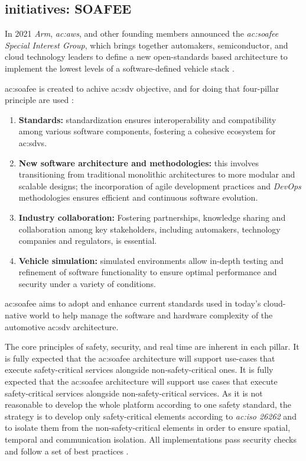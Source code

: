 \subsection{initiatives: SOAFEE}
In 2021 \textit{Arm}, \textit{\gls{ac:aws}}, and other founding members announced the \textit{\gls{ac:soafee} Special Interest Group}, which brings together automakers, semiconductor, and cloud technology leaders to define a new open-standards based architecture to implement the lowest levels of a software-defined vehicle stack \cite{DevelopersWorkflow}.

\gls{ac:soafee} is created to achive \gls{ac:sdv} objective, and for doing that four-pillar principle are used \cite{SoafeeProject}:
\begin{enumerate}
    \item \textbf{Standards:} standardization ensures interoperability and compatibility among various software components, fostering a cohesive ecosystem for \gls{ac:sdv}s.
    \item \textbf{New software architecture and methodologies:} this involves transitioning from traditional monolithic architectures to more modular and scalable designs; the incorporation of agile development practices and \textit{DevOps} methodologies ensures efficient and continuous software evolution.
    \item \textbf{Industry collaboration:} Fostering partnerships, knowledge sharing and collaboration among key stakeholders, including automakers, technology companies and regulators, is essential.
    \item \textbf{Vehicle simulation:} simulated environments allow in-depth testing and refinement of software functionality to ensure optimal performance and security under a variety of conditions.
\end{enumerate}
\gls{ac:soafee} aims to adopt and enhance current standards used in today's cloud-native world to help manage the software and hardware complexity of the automotive \gls{ac:sdv} architecture.

The core principles of safety, security, and real time are inherent in each pillar. It is fully expected that the \gls{ac:soafee} architecture will support use-cases that execute safety-critical services alongside non-safety-critical ones. It is fully expected that the \gls{ac:soafee} architecture will support use cases that execute safety-critical services alongside non-safety-critical services. As it is not reasonable to develop the whole platform according to one safety standard, the strategy is to develop only safety-critical elements according to \textit{\gls{ac:iso} 26262} and to isolate them from the non-safety-critical elements in order to ensure spatial, temporal and communication isolation. All implementations pass security checks and follow a set of best practices \cite{SoafeeArchitectureOverview}.

